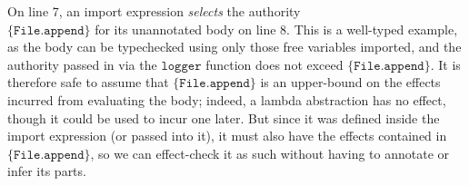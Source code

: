 \documentclass[sigplan,10pt]{acmart}\settopmatter{}
\newcommand{\File}{\kwa{File}}
\newcommand{\kwa}[1]{\mathtt{#1}}
\newcommand{\fx}[1]{\kwa{effects}(#1)}
\begin{document}
On line 7, an import expression \textit{selects} the authority\\ $\{\kwa{File.append}\}$ for its unannotated body on line 8. This is a well-typed example, as the body can be typechecked using only those free variables imported, and the authority passed in via the $\kwa{logger}$ function does not exceed $\{\kwa{File.append}\}$. It is therefore safe to assume that $\{\kwa{File.append}\}$ is an upper-bound on the effects incurred from evaluating the body; indeed, a lambda abstraction has no effect, though it could be used to incur one later. But since it was defined inside the import expression (or passed into it), it must also have the effects contained in $\{\kwa{File.append}\}$, so we can effect-check it as such without having to annotate or infer its parts.

%
%
%
%
%
%
%
%
%
\end{document}
